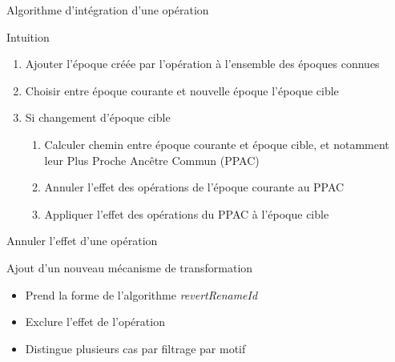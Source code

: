 \begin{frame}{Algorithme d'intégration d'une opération \ren}
  \begin{block}{Intuition}
    \begin{enumerate}
      \item {\color{gray}Ajouter l'époque créée par l'opération \ren à l'ensemble des époques connues}
      \item {\color{gray}Choisir entre époque courante et nouvelle époque l'époque cible}
      \item {\color{gray}Si changement d'époque cible}
      \begin{enumerate}
        \item {\color{gray}Calculer chemin entre époque courante et époque cible, et notamment leur Plus Proche Ancêtre Commun (PPAC)}
        \item \alert{Annuler l'effet des opérations \ren de l'époque courante au PPAC}
        \item Appliquer l'effet des opérations \ren du PPAC à l'époque cible
      \end{enumerate}
    \end{enumerate}
  \end{block}
\end{frame}

\begin{frame}{Annuler l'effet d'une opération \ren}
  \begin{block}{Ajout d'un nouveau mécanisme de transformation}
    \begin{itemize}
      \item<2-> Prend la forme de l'algorithme \emph{revertRenameId}
      \item<3-> \alert{Exclure l'effet de l'opération \ren}
      \item<4-> Distingue plusieurs cas par \alert{filtrage par motif}
    \end{itemize}
  \end{block}
\end{frame}

